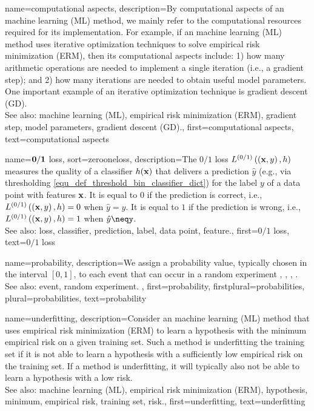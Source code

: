 {
{name={computational aspects}, 
	description={By computational 
		aspects of an machine learning (ML) method, we mainly refer to the computational 
		resources required for its implementation. For example, if an machine learning (ML) method uses iterative 
		optimization techniques to solve empirical risk minimization (ERM), then its computational aspects include: 1) how 
		many arithmetic operations are needed to implement a single iteration (i.e., a gradient step); 
		and 2) how many iterations are needed to obtain useful model parameters. One important 
		example of an iterative optimization technique is gradient descent (GD).
					\\ 
		See also: machine learning (ML), empirical risk minimization (ERM), gradient step, model parameters, gradient descent (GD).}, 
	first={computational aspects},
	text={computational aspects}
}

{name={$\bf 0/1$ loss},
sort={zerooneloss}, 
	description={The $0/1$ loss $L^{(0/1)}\left(\left( {\bf x},y \right),h \right)$ 
		measures the quality of a classifier $h({\bf x})$ that delivers a 
		prediction $\hat{y}$ (e.g., via thresholding \eqref{equ_def_threshold_bin_classifier_dict}) 
		for the label $y$ of a data point with features ${\bf x}$. It is equal to $0$ if 
		the prediction is correct, i.e., 
		$L^{(0/1)}\left(\left( {\bf x},y \right),h \right)=0$ when $\hat{y}=y$. It is 
		equal to $1$ if the prediction is wrong, i.e., $L^{(0/1)}\left(\left( {\bf x},y \right),h \right)=1$ 
		when $\hat{y}\neqy$.
				\\ 
		See also: loss, classifier, prediction, label, data point, feature.},
    	first={$0/1$ loss},
	text={$0/1$ loss}
}

{name={probability}, 
	description={We assign a probability value, typically chosen in the 
		interval $[0,1]$, to each event that can occur in a random experiment  
		\cite{BillingsleyProbMeasure}, \cite{BertsekasProb}, \cite{HalmosMeasure},  \cite{KallenbergBook}.
		\\
		See also: event, random experiment. },
	first={probability},
	firstplural={probabilities},
	plural={probabilities},
	text={probability}
}
	
{name={underfitting},
	description={Consider 
		an machine learning (ML) method that uses empirical risk minimization (ERM) to learn a hypothesis with the minimum empirical risk 
		on a given training set. Such a method is underfitting the training set if it is 
		not able to learn a hypothesis with a sufficiently low empirical risk on the training set. 
		If a method is underfitting, it will typically also not be able to learn a hypothesis with 
		a low risk.
					\\ 
		See also: machine learning (ML), empirical risk minimization (ERM), hypothesis, minimum, empirical risk, training set, risk.},
	first={underfitting},
	text={underfitting}
}

}
